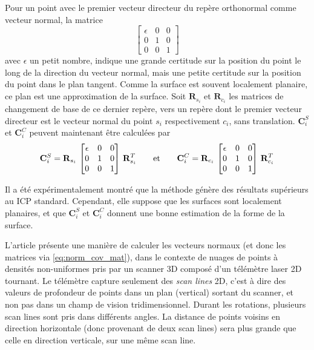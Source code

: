 \documentclass[a4paper,10pt]{scrreprt}
\begin{document}
Pour un point avec le premier vecteur directeur du repère orthonormal comme vecteur normal, la matrice
\begin{equation*}
	\begin{bmatrix}
		\epsilon & 0 & 0 \\
		0 & 1 & 0 \\
		0 & 0 & 1
	\end{bmatrix}
\end{equation*}
avec $\epsilon$ un petit nombre, indique une grande certitude sur la position du point le long de la direction du vecteur normal, mais une petite certitude sur la position du point dans le plan tangent. Comme la surface est souvent localement planaire, ce plan est une approximation de la surface. Soit $\mathbf{R}_{s_i}$ et $\mathbf{R}_{c_i}$ les matrices de changement de base de ce dernier repère, vers un repère dont le premier vecteur directeur est le vecteur normal du point $s_i$ respectivement $c_i$, sans translation. $\mathbf{C}^S_i$ et $\mathbf{C}^C_i$ peuvent maintenant être calculées par
\begin{equation} \label{eq:norm_cov_mat}
	\mathbf{C}^S_i = \mathbf{R}_{s_i} \, \begin{bmatrix}
		\epsilon & 0 & 0 \\
		0 & 1 & 0 \\
		0 & 0 & 1
	\end{bmatrix} \, \mathbf{R}_{s_i}^T
	\hspace{7mm} \text{et} \hspace{7mm}
	\mathbf{C}^C_i = \mathbf{R}_{c_i} \, \begin{bmatrix}
		\epsilon & 0 & 0 \\
		0 & 1 & 0 \\
		0 & 0 & 1
	\end{bmatrix} \, \mathbf{R}_{c_i}^T
\end{equation}

Il a été expérimentalement montré que la méthode génère des résultats supérieurs au ICP standard. \cite{Sega2009} Cependant, elle suppose que les surfaces sont localement planaires, et que $\mathbf{C}^S_i$ et $\mathbf{C}^C_i$ donnent une bonne estimation de la forme de la surface.

L'article \cite{Holz2014} présente une manière de calculer les vecteurs normaux (et donc les matrices via \ref{eq:norm_cov_mat}), dans le contexte de nuages de points à densités non-uniformes pris par un scanner 3D composé d'un télémètre laser 2D tournant. Le télémètre capture seulement des \emph{scan lines} 2D, c'est à dire des valeurs de profondeur de points dans un plan (vertical) sortant du scanner, et non pas dans un champ de vision tridimensionnel. Durant les rotations, plusieurs scan lines sont pris dans différents angles. La distance de points voisins en direction horizontale (donc provenant de deux scan lines) sera plus grande que celle en direction verticale, sur une même scan line.
\end{document}
